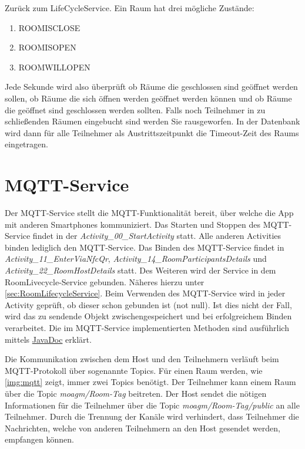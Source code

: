 Zurück zum LifeCycleService.
Ein Raum hat drei mögliche Zustände:
\begin{enumerate}
\item ROOMISCLOSE
\item ROOMISOPEN
\item ROOMWILLOPEN
\end{enumerate}
 Jede Sekunde wird also überprüft ob Räume die geschlossen sind geöffnet werden sollen, ob Räume die sich öffnen werden geöffnet werden können und ob Räume die geöffnet sind geschlossen werden sollten. 
Falls noch Teilnehmer in zu schließenden Räumen eingebucht sind werden Sie rausgeworfen. In der Datenbank wird dann für alle Teilnehmer als Austrittszeitpunkt die Timeout-Zeit des Raums eingetragen.



\section{MQTT-Service}
\label{sec:MQTT Service}
Der MQTT-Service stellt die MQTT-Funktionalität bereit, über welche die App mit anderen Smartphones kommuniziert.
Das Starten und Stoppen des MQTT-Service findet in der \textit{Activity\_00\_StartActivity} statt. Alle anderen Activities binden lediglich den MQTT-Service. Das Binden des MQTT-Service findet in  \textit{Activity\_11\_EnterViaNfcQr}, \textit{Activity\_14\_RoomParticipantsDetails} und \textit{Activity\_22\_RoomHostDetails} statt. Des Weiteren wird der Service in dem RoomLivecycle-Service gebunden. Näheres hierzu unter \cref{sec:RoomLifecycleService}.  Beim Verwenden des MQTT-Service wird in jeder Activity geprüft, ob dieser schon gebunden ist (not null). Ist dies nicht der Fall, wird das zu sendende Objekt zwischengespeichert und bei erfolgreichem Binden verarbeitet. 
Die im MQTT-Service implementierten Methoden sind ausführlich mittels \href{https://scm.inftech.hs-mannheim.de/gogs/moa/20moagm/src/dev/Doku/javadoc}{JavaDoc} erklärt. 

Die Kommunikation zwischen dem Host und den Teilnehmern verläuft beim MQTT-Protokoll über sogenannte Topics. Für einen Raum werden, wie \cref{img:mqtt} zeigt, immer zwei Topics benötigt. Der Teilnehmer kann einem Raum über die Topic \textit{moagm/Room-Tag} beitreten. Der Host sendet die nötigen Informationen für die Teilnehmer über die Topic \textit{moagm/Room-Tag/public} an alle Teilnehmer. Durch die Trennung der Kanäle wird verhindert, dass Teilnehmer die Nachrichten, welche von anderen Teilnehmern an den Host gesendet werden, empfangen können.

